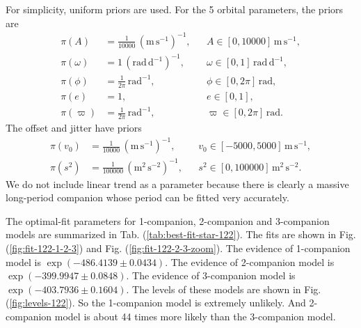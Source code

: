 \documentclass[letterpaper, preprint]{aastex}
\newcommand{\unit}[1]{\mathrm{#1}}
\begin{document}
For simplicity, uniform priors are used. For the 5 orbital parameters, the priors are
\begin{align}
\pi(A) &= \frac{1}{10000}\,\unit{(m\,s^{-1})^{-1}},&&A\in[0,10000]\,\unit{m\,s^{-1}},\\
\pi(\omega) &= 1\,\unit{(rad\,d^{-1})^{-1}}, &&\omega\in[0,1]\,\unit{rad\,d^{-1}},\\
\pi(\phi) &= \frac{1}{2\pi}\,\unit{rad^{-1}},&&\phi\in[0,2\pi]\,\unit{rad},\\
\pi(e) &= 1,&&e\in[0,1],\\
\pi(\varpi) &= \frac{1}{2\pi}\,\unit{rad^{-1}},&&\varpi\in[0,2\pi]\,\unit{rad}.
\end{align}
The offset and jitter have priors
\begin{align}
\pi(v_0) &= \frac{1}{10000}\,\unit{(m\,s^{-1})^{-1}},&&v_0\in[-5000,5000]\,\unit{m\,s^{-1}},\\
\pi(s^2) &=\frac{1}{100000}\,\unit{(m^2\,s^{-2})^{-1}},&&s^2\in[0,100000]\,\unit{m^2\,s^{-2}}.
\end{align}
We do not include linear trend as a parameter because there is clearly a massive long-period companion whose period can be fitted very accurately.

The optimal-fit parameters for 1-companion, 2-companion and 3-companion models are summarized in Tab. (\ref{tab:best-fit-star-122}). The fits are shown in Fig. (\ref{fig:fit-122-1-2-3}) and Fig. (\ref{fig:fit-122-2-3-zoom}). The evidence of 1-companion model is $\exp{(-486.4139\pm0.0434)}$. The evidence of 2-companion model is $\exp{(-399.9947\pm0.0848)}$. The evidence of 3-companion model is $\exp{(-403.7936\pm0.1604)}$. The levels of these models are shown in Fig. (\ref{fig:levels-122}). So the 1-companion model is extremely unlikely. And 2-companion model is about 44 times more likely than the 3-companion model.
\end{document}
